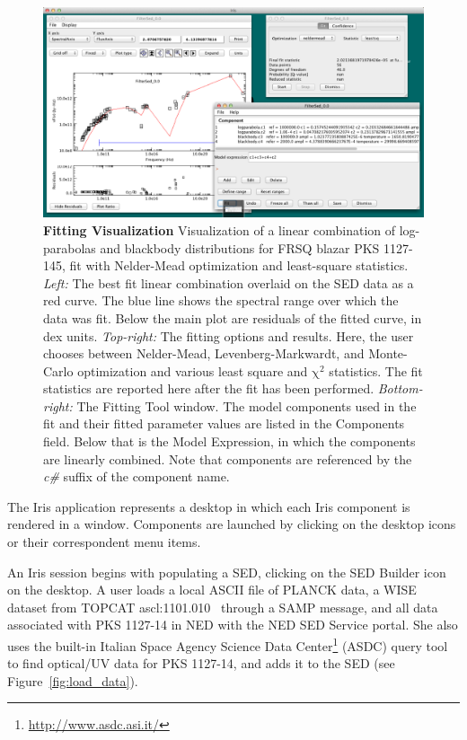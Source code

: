 \documentclass[final,5p,authoryear]{elsarticle}
\begin{document}
\begin{figure} \centering
\includegraphics[height=0.3\textheight]{figures/fitting-1.png}
\caption{\textbf{Fitting Visualization} Visualization of a linear combination of
log-parabolas and blackbody distributions for FRSQ blazar PKS 1127-145, fit with
Nelder-Mead optimization and least-square statistics. \textit{Left:} The best fit
linear combination overlaid on the SED data as a red curve. The blue line shows
the spectral range over which the data was fit. Below the main plot are
residuals of the fitted curve, in dex units. \textit{Top-right:} The fitting
options and results. Here, the user chooses between Nelder-Mead,
Levenberg-Markwardt, and Monte-Carlo \citep[Differential Evolution, ][]{Storn:1997:DEN:596061.596146}
optimization and various least square and
$\mathrm{\chi}^{2}$ statistics. The fit statistics are reported here after the
fit has been performed. \textit{Bottom-right:} The Fitting Tool window. The
model components used in the fit and their fitted parameter values are listed in
the Components field. Below that is the Model Expression, in which the
components are linearly combined. Note that components are referenced by the
\textit{c\#} suffix of the component name.} \label{fig:fitting1} \end{figure}

The Iris application represents a desktop in which each Iris component is rendered in a window. Components are launched by clicking on the desktop icons or their correspondent menu items.

An Iris session begins with populating a SED, clicking on the SED Builder icon on the
desktop. A user loads a local ASCII file of
PLANCK data, a WISE dataset from TOPCAT ascl:1101.010~\citep{2005ASPC..347...29T} 
through a SAMP message, and all data associated with PKS 1127-14 in NED with the NED SED
Service portal. She also uses the built-in Italian Space Agency Science Data
Center\footnote{\url{http://www.asdc.asi.it/}} (ASDC) query tool to find
optical/UV data for PKS 1127-14, and adds it to the SED (see
Figure~\ref{fig:load_data}).
\end{document}
